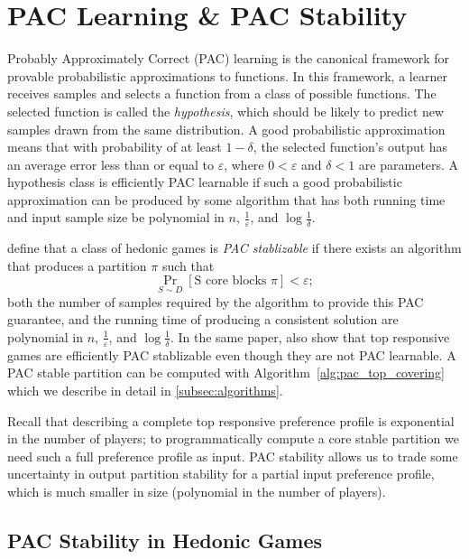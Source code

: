 \section{PAC Learning \& PAC Stability}
\label{sec:pac_learning_pac_stability}
Probably Approximately Correct (PAC) learning is the canonical framework for
provable probabilistic approximations to functions.
In this framework, a learner receives samples and selects a function from a class
of possible functions.
The selected function is called the \textit{hypothesis}, which should be likely
to predict new samples drawn from the same distribution.
A good probabilistic approximation means that with probability of at least
$1 - \delta$, the selected function's output has an average error less than or
equal to $\varepsilon$, where $0 < \varepsilon$ and $\delta < 1$ are parameters.
A hypothesis class is efficiently PAC learnable if such a good probabilistic
approximation can be produced by some algorithm that has both running time and
input sample size be polynomial in $n$, $\frac{1}{\varepsilon}$, and
$\log{\frac{1}{\delta}}$.

 define that a class of hedonic games is
\textit{PAC stablizable}
if there exists an algorithm that produces a partition $\pi$ such that
$$\Pr_{S\sim D}[\text{S core blocks } \pi] < \varepsilon;$$
both the number of samples required by the algorithm to provide this PAC guarantee,
and the running time of producing a consistent solution are polynomial in $n$,
$\frac{1}{\varepsilon}$, and $\log{\frac{1}{\delta}}$.
In the same paper,  also show that top responsive games
are efficiently PAC stablizable even though they are not PAC learnable.
A PAC stable partition can be computed with Algorithm~\ref{alg:pac_top_covering}
which we describe in detail in \autoref{subsec:algorithms}.

Recall that describing a complete top responsive preference profile is exponential
in the number of players; to programmatically compute a core stable partition
we need such a full preference profile as input.
PAC stability allows us to trade some uncertainty in output partition stability
for a partial input preference profile, which is much smaller in size
(polynomial in the number of players).



\subsection{PAC Stability in Hedonic Games}\label{subsec:pac-stability}

